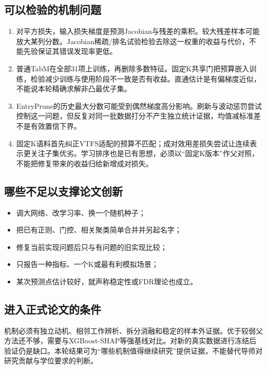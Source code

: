 \documentclass[UTF8,11pt,a4paper]{ctexart}
\providecommand{\tightlist}{\setlength{\itemsep}{0pt}\setlength{\parskip}{0pt}}
\begin{document}
\subsection{可以检验的机制问题}\label{ux53efux4ee5ux68c0ux9a8cux7684ux673aux5236ux95eeux9898}

\begin{enumerate}
\def\labelenumi{\arabic{enumi}.}
\tightlist
\item
  对平方损失，输入损失梯度是预测Jacobian与残差的乘积。较大残差样本可能放大某列分数。Jacobian稀疏/排名试验检验去除这一权重的收益与代价，不能先验保证其错误发现率更低。
\item
  普通TabM在全部31项上训练，再删除多数特征。固定K共享门把预算嵌入训练，检验减少训练与使用阶段不一致是否有收益。直通估计是有偏梯度近似，不能说本轮精确求解非凸最优子集。
\item
  EntryPrune的历史最大分数可能受到偶然梯度高分影响。刷新与波动惩罚尝试控制这一问题，但反复对同一批数据打分不产生独立统计证据，均值减标准差不是有效置信下界。
\item
  固定K语料首先纠正VTFS适配的预算不匹配；成对效用差损失尝试让连续表示更关注子集优劣。学习排序也是已有思想，必须以``固定K版本''作父对照，不能把修复带来的收益归给新增成对损失。
\end{enumerate}

\subsection{哪些不足以支撑论文创新}\label{ux54eaux4e9bux4e0dux8db3ux4ee5ux652fux6491ux8bbaux6587ux521bux65b0}

\begin{itemize}
\tightlist
\item
  调大网络、改学习率、换一个随机种子；
\item
  把已有正则、门控、相关聚类简单合并并另起名字；
\item
  修复当前实现问题后只与有问题的旧实现比较；
\item
  只报告一种指标、一个K或最有利模拟场景；
\item
  某次预测点估计较好，就声称稳定性或FDR理论也成立。
\end{itemize}

\subsection{进入正式论文的条件}\label{ux8fdbux5165ux6b63ux5f0fux8bbaux6587ux7684ux6761ux4ef6}

机制必须有独立动机、相邻工作辨析、拆分消融和稳定的样本外证据。优于较弱父方法还不够，需要与XGBoost-SHAP等强基线对比。对新的真实数据进行冻结后验证仍是缺口。本轮结果可为``哪些机制值得继续研究''提供证据，不能替代导师对研究贡献与学位要求的判断。
\end{document}
